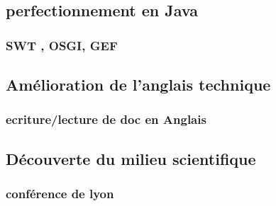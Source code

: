 \documentclass{article}
\begin{document}
    \subsection{perfectionnement en Java}
        \subsubsection{SWT , OSGI, GEF}
    \subsection{Amélioration de l'anglais technique}
        \subsubsection{ecriture/lecture de doc en Anglais}
    \subsection{Découverte du milieu scientifique}
        \subsubsection{conférence de lyon}
    
\end{document}
